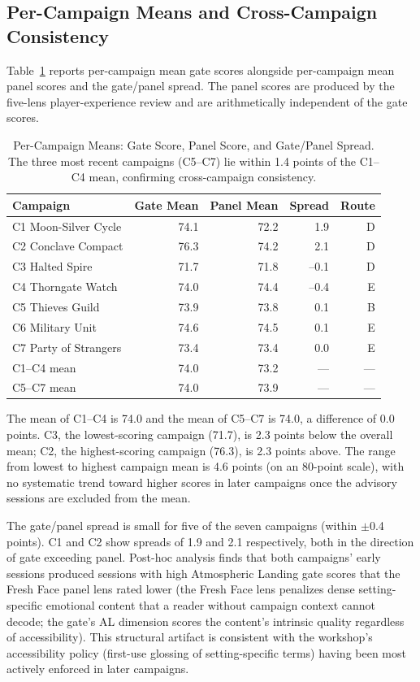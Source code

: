 \subsection{Per-Campaign Means and Cross-Campaign Consistency}

Table~\ref{tab:campaign-means} reports per-campaign mean gate scores alongside per-campaign
mean panel scores and the gate/panel spread. The panel scores are produced by the
five-lens player-experience review and are arithmetically independent of the gate scores.

\begin{table}[t]
\caption{Per-Campaign Means: Gate Score, Panel Score, and Gate/Panel Spread.
  The three most recent campaigns (C5--C7) lie within 1.4 points of the C1--C4 mean,
  confirming cross-campaign consistency.}
\label{tab:campaign-means}
\begin{tabular}{@{}lrrrr@{}}
\toprule
Campaign & Gate Mean & Panel Mean & Spread & Route \\
\midrule
C1 Moon-Silver Cycle    & 74.1 & 72.2 & 1.9 & D \\
C2 Conclave Compact     & 76.3 & 74.2 & 2.1 & D \\
C3 Halted Spire         & 71.7 & 71.8 & --0.1 & D \\
C4 Thorngate Watch      & 74.0 & 74.4 & --0.4 & E \\
C5 Thieves Guild        & 73.9 & 73.8 & 0.1 & B \\
C6 Military Unit        & 74.6 & 74.5 & 0.1 & E \\
C7 Party of Strangers   & 73.4 & 73.4 & 0.0 & E \\
\midrule
C1--C4 mean             & 74.0 & 73.2 & --- & --- \\
C5--C7 mean             & 74.0 & 73.9 & --- & --- \\
\bottomrule
\end{tabular}
\end{table}

The mean of C1--C4 is 74.0 and the mean of C5--C7 is 74.0, a difference of 0.0 points.
C3, the lowest-scoring campaign (71.7), is 2.3 points below the overall mean; C2, the
highest-scoring campaign (76.3), is 2.3 points above. The range from lowest to highest
campaign mean is 4.6 points (on an 80-point scale), with no systematic trend toward
higher scores in later campaigns once the advisory sessions are excluded from the mean.

The gate/panel spread is small for five of the seven campaigns (within $\pm$0.4 points).
C1 and C2 show spreads of 1.9 and 2.1 respectively, both in the direction of gate
exceeding panel. Post-hoc analysis finds that both campaigns' early sessions produced
sessions with high Atmospheric Landing gate scores that the Fresh Face panel lens rated
lower (the Fresh Face lens penalizes dense setting-specific emotional content that a
reader without campaign context cannot decode; the gate's AL dimension scores the
content's intrinsic quality regardless of accessibility). This structural artifact is
consistent with the workshop's accessibility policy (first-use glossing of
setting-specific terms) having been most actively enforced in later campaigns.

